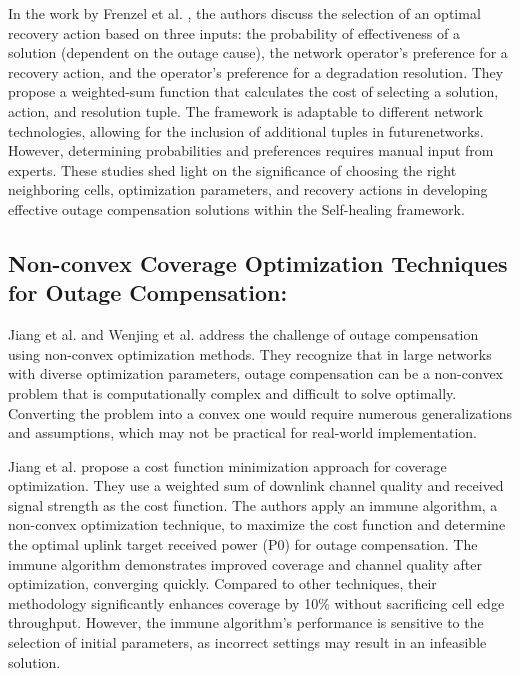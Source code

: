 In the work by Frenzel et al. \cite{frenzel2012automated}, the authors discuss the selection of an optimal recovery action based on three inputs: the probability of effectiveness of a solution (dependent on the outage cause), the network operator's preference for a recovery action, and the operator's preference for a degradation resolution. They propose a weighted-sum function that calculates the cost of selecting a solution, action, and resolution tuple. The framework is adaptable to different network technologies, allowing for the inclusion of additional tuples in futurenetworks. However, determining probabilities and preferences requires manual input from experts.
These studies shed light on the significance of choosing the right neighboring cells, optimization parameters, and recovery actions in developing effective outage compensation solutions within the Self-healing framework.

\subsection{Non-convex Coverage Optimization Techniques for Outage Compensation:}

Jiang et al. \cite{jiang2013cell} and Wenjing et al. \cite{wenjing2012centralized} address the challenge of outage compensation using non-convex optimization methods. They recognize that in large networks with diverse optimization parameters, outage compensation can be a non-convex problem that is computationally complex and difficult to solve optimally. Converting the problem into a convex one would require numerous generalizations and assumptions, which may not be practical for real-world implementation.

Jiang et al. \cite{jiang2013cell} propose a cost function minimization approach for coverage optimization. They use a weighted sum of downlink channel quality and received signal strength as the cost function. The authors apply an immune algorithm, a non-convex optimization technique, to maximize the cost function and determine the optimal uplink target received power (P0) for outage compensation. The immune algorithm demonstrates improved coverage and channel quality after optimization, converging quickly. Compared to other techniques, their methodology significantly enhances coverage by 10\% without sacrificing cell edge throughput. However, the immune algorithm's performance is sensitive to the selection of initial parameters, as incorrect settings may result in an infeasible solution.

